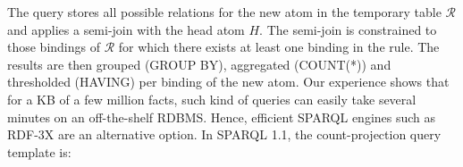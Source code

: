 \noindent The query stores all possible relations for the new atom in the temporary table $\mathcal{R}$ and
applies a semi-join with the head atom $H$. The semi-join is constrained to those bindings of $\mathcal{R}$ for 
which there exists at least one binding in the rule. The results are then grouped (GROUP BY), aggregated (COUNT(*)) 
and thresholded (HAVING) per binding of the new atom.
Our experience shows that for a KB of a few million facts, such kind of queries 
can easily take several minutes on an off-the-shelf RDBMS.
Hence, efficient SPARQL engines such as RDF-3X \cite{rdf3x} are an alternative option. 
In SPARQL 1.1, the count-projection query template is: \\
\\

